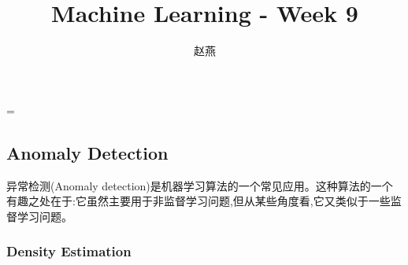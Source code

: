 \documentclass{article}
\title{Machine Learning - Week 9}
\author{赵燕}
\date{}
\begin{document}
 
\hfuzz=\maxdimen
{}
\begin{CJK}{UTF8}{gbsn} 
\maketitle
\renewcommand\contentsname{目录}
\renewcommand\figurename{图}
\tableofcontents
\newpage

\part{Anomaly Detection}
\subparagraph{}
异常检测(Anomaly detection)是机器学习算法的一个常见应用。这种算法的一个有趣之处在于:它虽然主要用于非监督学习问题,但从某些角度看,它又类似于一些监督学习问题。
\section{Density Estimation}

\end{CJK}
\end{document}
